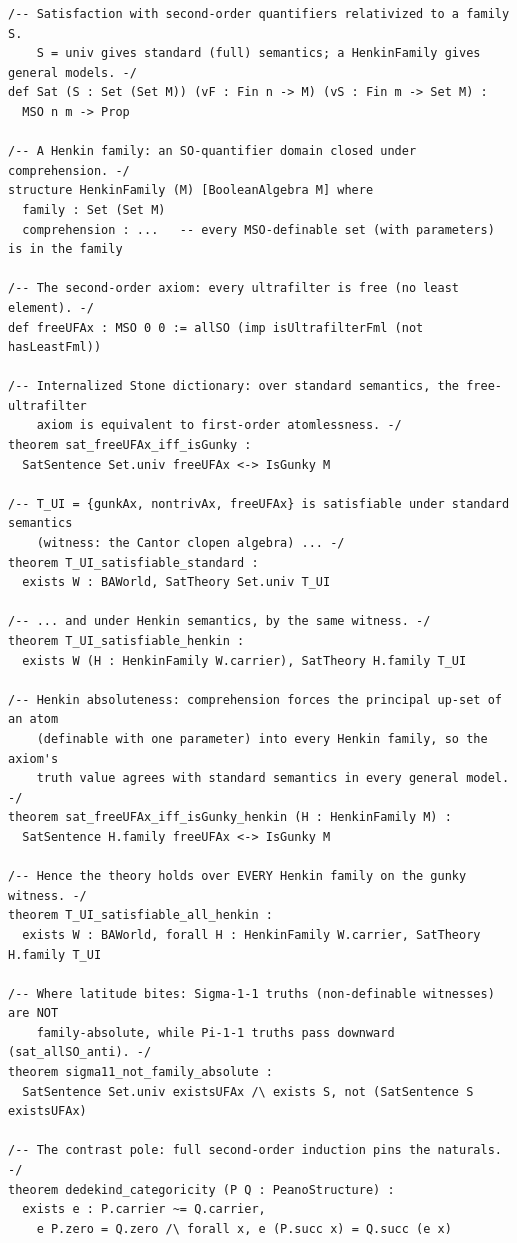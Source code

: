 \documentclass[]{article}
\theoremstyle{definition}
\theoremstyle{remark}
\begin{document}
\begin{lstlisting}
/-- Satisfaction with second-order quantifiers relativized to a family S.
    S = univ gives standard (full) semantics; a HenkinFamily gives general models. -/
def Sat (S : Set (Set M)) (vF : Fin n -> M) (vS : Fin m -> Set M) :
  MSO n m -> Prop

/-- A Henkin family: an SO-quantifier domain closed under comprehension. -/
structure HenkinFamily (M) [BooleanAlgebra M] where
  family : Set (Set M)
  comprehension : ...   -- every MSO-definable set (with parameters) is in the family

/-- The second-order axiom: every ultrafilter is free (no least element). -/
def freeUFAx : MSO 0 0 := allSO (imp isUltrafilterFml (not hasLeastFml))

/-- Internalized Stone dictionary: over standard semantics, the free-ultrafilter
    axiom is equivalent to first-order atomlessness. -/
theorem sat_freeUFAx_iff_isGunky :
  SatSentence Set.univ freeUFAx <-> IsGunky M

/-- T_UI = {gunkAx, nontrivAx, freeUFAx} is satisfiable under standard semantics
    (witness: the Cantor clopen algebra) ... -/
theorem T_UI_satisfiable_standard :
  exists W : BAWorld, SatTheory Set.univ T_UI

/-- ... and under Henkin semantics, by the same witness. -/
theorem T_UI_satisfiable_henkin :
  exists W (H : HenkinFamily W.carrier), SatTheory H.family T_UI

/-- Henkin absoluteness: comprehension forces the principal up-set of an atom
    (definable with one parameter) into every Henkin family, so the axiom's
    truth value agrees with standard semantics in every general model. -/
theorem sat_freeUFAx_iff_isGunky_henkin (H : HenkinFamily M) :
  SatSentence H.family freeUFAx <-> IsGunky M

/-- Hence the theory holds over EVERY Henkin family on the gunky witness. -/
theorem T_UI_satisfiable_all_henkin :
  exists W : BAWorld, forall H : HenkinFamily W.carrier, SatTheory H.family T_UI

/-- Where latitude bites: Sigma-1-1 truths (non-definable witnesses) are NOT
    family-absolute, while Pi-1-1 truths pass downward (sat_allSO_anti). -/
theorem sigma11_not_family_absolute :
  SatSentence Set.univ existsUFAx /\ exists S, not (SatSentence S existsUFAx)

/-- The contrast pole: full second-order induction pins the naturals. -/
theorem dedekind_categoricity (P Q : PeanoStructure) :
  exists e : P.carrier ~= Q.carrier,
    e P.zero = Q.zero /\ forall x, e (P.succ x) = Q.succ (e x)
\end{lstlisting}
\end{document}
